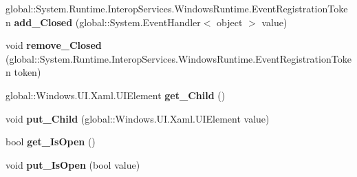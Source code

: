 \begin{DoxyCompactItemize}
\item 
\mbox{\label{interface_windows_1_1_u_i_1_1_xaml_1_1_controls_1_1_primitives_1_1_i_popup_a9ad51ec03f9494cd9cd44d9aca1e407e}} 
global\+::\+System.\+Runtime.\+Interop\+Services.\+Windows\+Runtime.\+Event\+Registration\+Token {\bfseries add\+\_\+\+Closed} (global\+::\+System.\+Event\+Handler$<$ object $>$ value)
\item 
\mbox{\label{interface_windows_1_1_u_i_1_1_xaml_1_1_controls_1_1_primitives_1_1_i_popup_a737cc2cd2691f9cd97ecc0521717a7e8}} 
void {\bfseries remove\+\_\+\+Closed} (global\+::\+System.\+Runtime.\+Interop\+Services.\+Windows\+Runtime.\+Event\+Registration\+Token token)
\item 
\mbox{\label{interface_windows_1_1_u_i_1_1_xaml_1_1_controls_1_1_primitives_1_1_i_popup_a2a367d0d43b67f93a3e5d442297dcbd5}} 
global\+::\+Windows.\+U\+I.\+Xaml.\+U\+I\+Element {\bfseries get\+\_\+\+Child} ()
\item 
\mbox{\label{interface_windows_1_1_u_i_1_1_xaml_1_1_controls_1_1_primitives_1_1_i_popup_a693a09a15b78af4217a6b3f0aac82e7c}} 
void {\bfseries put\+\_\+\+Child} (global\+::\+Windows.\+U\+I.\+Xaml.\+U\+I\+Element value)
\item 
\mbox{\label{interface_windows_1_1_u_i_1_1_xaml_1_1_controls_1_1_primitives_1_1_i_popup_a57fdf0a3dab46fba797ba81ba77b6670}} 
bool {\bfseries get\+\_\+\+Is\+Open} ()
\item 
\mbox{\label{interface_windows_1_1_u_i_1_1_xaml_1_1_controls_1_1_primitives_1_1_i_popup_a259760eea17810fafe0d637b9df53848}} 
void {\bfseries put\+\_\+\+Is\+Open} (bool value)
\item 
\mbox{\label{interface_windows_1_1_u_i_1_1_xaml_1_1_controls_1_1_primitives_1_1_i_popup_affde5c52107f2ff7472b84b7b7a1ab4d}} 

\end{DoxyCompactItemize}
